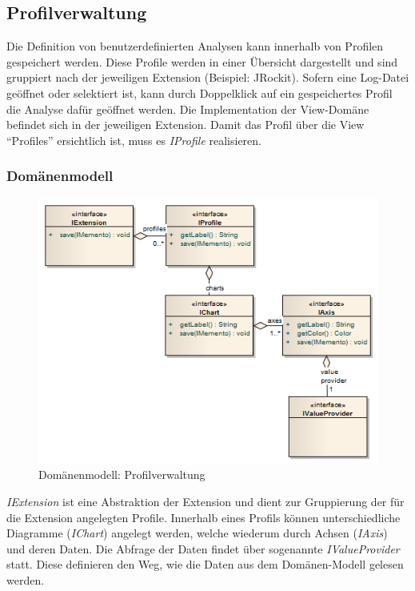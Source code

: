 \subsection{Profilverwaltung}
Die Definition von benutzerdefinierten Analysen kann innerhalb von Profilen gespeichert werden. Diese Profile werden in einer Übersicht dargestellt und sind gruppiert nach der jeweiligen Extension (Beispiel: JRockit). Sofern eine Log-Datei geöffnet oder selektiert ist, kann durch Doppelklick auf ein gespeichertes Profil die Analyse dafür geöffnet werden. Die Implementation der View-Domäne befindet sich in der jeweiligen Extension. Damit das Profil über die View ``Profiles'' ersichtlich ist, muss es \textit{IProfile} realisieren.
\subsubsection{Domänenmodell}
 \begin{figure}[H]
  	\centering
        	\caption{Domänenmodell: Profilverwaltung}
    	\includegraphics[width=13cm]{images/core_domain_profiles}
\end{figure}
\textit{IExtension} ist eine Abstraktion der Extension und dient zur Gruppierung der für die Extension angelegten Profile. Innerhalb eines Profils können unterschiedliche Diagramme (\textit{IChart}) angelegt werden, welche wiederum durch Achsen (\textit{IAxis}) und deren Daten. Die Abfrage der Daten findet über sogenannte \textit{IValueProvider} statt. Diese definieren den Weg, wie die Daten aus dem Domänen-Modell gelesen werden.

